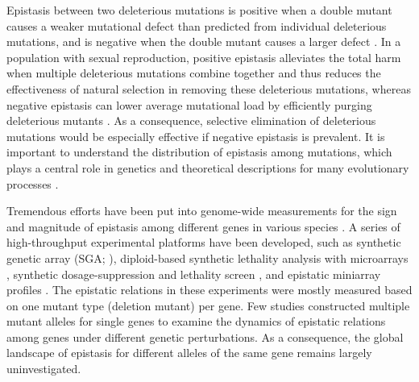 Epistasis between two deleterious mutations is positive when a double
mutant causes a weaker mutational defect than predicted from
individual deleterious mutations, and is negative when the double
mutant causes a larger defect \citep{Phillips2008, Boone2007}. In a
population with sexual
reproduction, positive epistasis alleviates the total harm when
multiple deleterious mutations combine together and thus reduces the
effectiveness of natural selection in removing these deleterious
mutations, whereas negative epistasis can lower average mutational
load by efficiently purging deleterious mutants \citep{Kimura1966}. As
a consequence,
selective elimination of deleterious mutations would be especially
effective if negative epistasis is prevalent. It is important to
understand the distribution of epistasis among mutations, which plays
a central role in genetics and theoretical descriptions for many
evolutionary processes \citep{Phillips2008, Boone2007}.

Tremendous efforts have been put into genome-wide measurements for the
sign and magnitude of epistasis among different genes in various
species \citep{Costanzo2010, Tong2004, Pan2004, Pan2006,
ISI:000176466300018, Measday2005, Sopko2006, Collins2007,
Kornmann2009, Fiedler2009, Bonhoeffer2004, Roguev2008}.  A series of
high-throughput experimental platforms have been developed, such as
synthetic genetic array (SGA; \citealt{Costanzo2010, Tong2004}),
diploid-based synthetic lethality analysis with microarrays
\citep{Pan2004, Pan2006}, synthetic dosage-suppression and lethality
screen \citep{ISI:000176466300018, Measday2005, Sopko2006}, and
epistatic miniarray profiles \citep{Collins2007, Kornmann2009,
Fiedler2009}. The epistatic relations in these
experiments were mostly measured based on one mutant type (deletion
mutant) per gene. Few studies constructed multiple mutant alleles for
single genes to examine the dynamics of epistatic relations among
genes under different genetic perturbations. As a consequence, the
global landscape of epistasis for different alleles of the same gene
remains largely uninvestigated.

